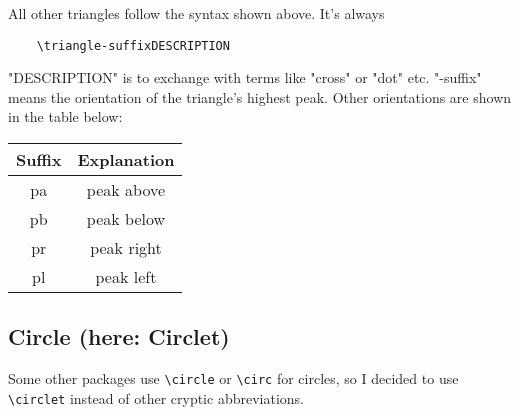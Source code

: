 \documentclass[a4paper,parskip=half,bibtotoc,11pt]{scrartcl}
\begin{document}
All other triangles follow the syntax shown above. It's always 

\begin{lstlisting}
	\triangle-suffixDESCRIPTION
\end{lstlisting}

"DESCRIPTION" is to exchange with terms like "cross" or "dot" etc. "-suffix" means the orientation of the triangle's highest peak. 
Other orientations are shown in the table below:


\begin{table}[H]
\centering
\begin{tabular}{|c|c|}
\hline
Suffix	&	Explanation	   \\ \hline \hline
pa & peak above \\ \hline
pb & peak below \\ \hline
pr & peak right \\ \hline
pl & peak left \\ \hline
\end{tabular}
\end{table}


\subsection{Circle (here: Circlet)}

Some other packages use \lstinline{\circle} or \lstinline{\circ} for circles, so I decided to use \lstinline{\circlet} instead of other cryptic abbreviations.    
\end{document}
